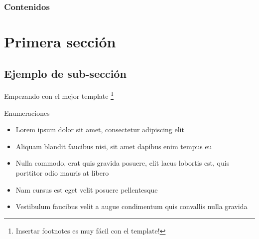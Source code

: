 %
%

\begin{frame}
	\titlepage
\end{frame}

\begin{frame}
	\frametitle{Contenidos}
	\tableofcontents
\end{frame}

\section{Primera sección}

\subsection{Ejemplo de sub-sección}


\begin{frame}{Empezando con el mejor template}
	\lipsum[1] \footnote{Insertar footnotes es muy fácil con el template!}
\end{frame}


\begin{frame}{Enumeraciones}
	\begin{itemize}
		\item Lorem ipsum dolor sit amet, consectetur adipiscing elit
		\item Aliquam blandit faucibus nisi, sit amet dapibus enim tempus eu
		\item Nulla commodo, erat quis gravida posuere, elit lacus lobortis est, quis porttitor odio mauris at libero
		\item Nam cursus est eget velit posuere pellentesque
		\item Vestibulum faucibus velit a augue condimentum quis convallis nulla gravida
	\end{itemize}
\end{frame}


